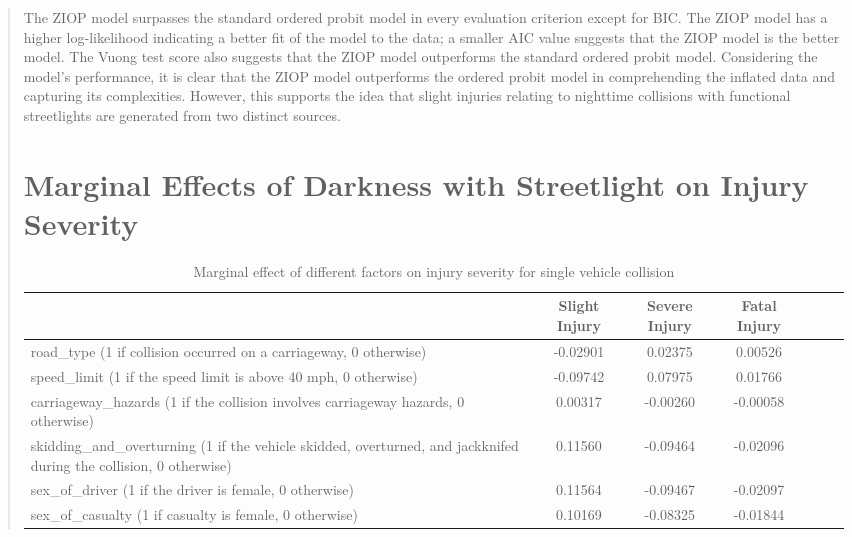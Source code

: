 \documentclass[12]{report}
\begin{document}
\begin{quote}
{The ZIOP model surpasses the standard ordered probit model in every evaluation criterion except for BIC. The ZIOP model has a higher log-likelihood indicating a better fit of the model to the data; a smaller AIC value suggests that the ZIOP model is the better model. The Vuong test score also suggests that the ZIOP model outperforms the standard ordered probit model.  Considering the model's performance, it is clear that the ZIOP model outperforms the ordered probit model in comprehending the inflated data and capturing its complexities. However, this supports the idea that slight injuries relating to nighttime collisions with functional streetlights  are generated from two distinct sources.


\clearpage
\section{Marginal Effects of Darkness with Streetlight on Injury Severity}

\begin{table}[H]
\renewcommand{\arraystretch}{1.5}
\centering
\caption{Marginal effect of different factors on injury severity for single vehicle collision}
\begin{tabular}{p{11cm} ccc ccc}
\toprule
  & \textbf{Slight Injury} & \textbf{Severe Injury} & \textbf{Fatal Injury} \\
\midrule
road\_type (1 if collision occurred on a carriageway, 0 otherwise) & -0.02901 & 0.02375 & 0.00526 \\
speed\_limit (1 if the speed limit is above 40 mph, 0 otherwise) & -0.09742 & 0.07975 & 0.01766 \\
carriageway\_hazards (1 if the collision involves carriageway hazards, 0 otherwise) & 0.00317 & -0.00260 & -0.00058 \\
skidding\_and\_overturning (1 if the vehicle skidded, overturned, and jackknifed during the collision, 0 otherwise) & 0.11560 & -0.09464 & -0.02096 \\
sex\_of\_driver (1 if the driver is female, 0 otherwise) & 0.11564 & -0.09467 & -0.02097 \\
sex\_of\_casualty (1 if casualty is female, 0 otherwise) & 0.10169 & -0.08325 & -0.01844 \\
\bottomrule
\end{tabular}
\end{table}








}
\end{quote}
\end{document}
